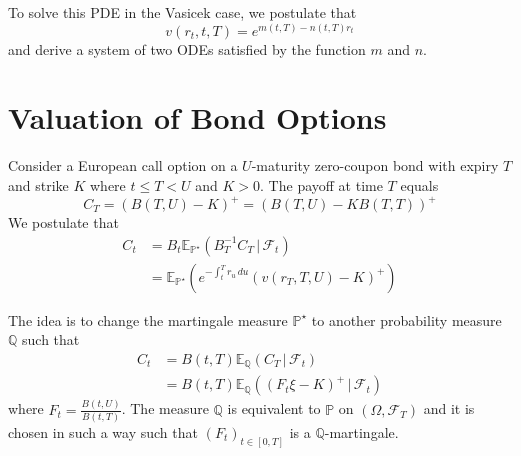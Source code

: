 \documentclass[10pt, oneside, reqno]{amsbook}
\theoremstyle{plain}%
\newtheorem{lem}[thm]{Lemma}
\theoremstyle{definition}
\theoremstyle{remark}
\newcommand{\var}{\text{Var}}
\newcommand{\given}{ \, | \,}
\newcommand{\sigf}{\mathcal{F}}
\newcommand{\Q}{\mathbb{Q}}
\newcommand{\E}{\mathbb{E}}
\renewcommand{\P}{\mathbb{P}}
\numberwithin{equation}{chapter}
\begin{document}
To solve this PDE in the Vasicek case, we postulate that \[
	v(r_t, t, T) = e^{m(t, T) - n(t, T) r_t}
\] and derive a system of two ODEs satisfied by the function $m$ and $n$. 



\section{Valuation of Bond Options} %
\label{sub:valuation_of_bond_optiosn}

Consider a European call option on a $U$-maturity zero-coupon bond with expiry $T$ and strike $K$ where $t \leq T < U$ and $K > 0$.  The payoff at time $T$ equals \[
	C_T = \left(B(T, U) - K \right)^+ = \left(B(T, U) - KB(T, T) \right)^+
\]  We postulate that \begin{align*}
	C_t 	&= B_t \E_{\P^\star} \left(B_T^{-1} C_T \given \sigf_t \right) \\
			&= \E_{\P^\star} \left( e^{-\int_t^T r_u \, du} \left(v\left(r_T, T, U \right) - K\right)^+ \right)	
\end{align*}

The idea is to change the martingale measure $\P^\star$ to another probability measure $\Q$ such that \begin{align*}
	C_t &= B(t, T) \E_{\Q} \left(C_T \given \sigf_t \right) \\
	&= B(t, T) \E_{\Q} \left( \left(F_t \xi - K \right)^+ \given \sigf_t \right)
\end{align*} where $F_t = \frac{B(t, U)}{B(t, T)}$.  The measure $\Q$ is equivalent to $\P$ on $(\Omega, \sigf_T)$ and it is chosen in such a way such that $(F_t)_{t \in [0, T]}$ is a $\Q$-martingale.
\end{document}
